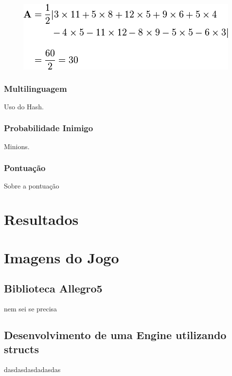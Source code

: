 \documentclass[12pt]{article}
\begin{document}
\begin{center}
\begin{figure}
\includegraphics[width=.7\textwidth]{equacao6.png}
\label{fig:fig}
\end{figure}
\end{center}

\subsubsection{Multilinguagem}

Uso do Hash.

\subsubsection{Probabilidade Inimigo}

Minions.

\subsubsection{Pontuação}

Sobre a pontuação

\section{Resultados}

\section{Imagens do Jogo}\label{sec:figs}

\subsection{Biblioteca Allegro5}

nem sei se precisa

\subsection{Desenvolvimento de uma Engine utilizando structs}

dasdasdasdadasdas
\end{document}
